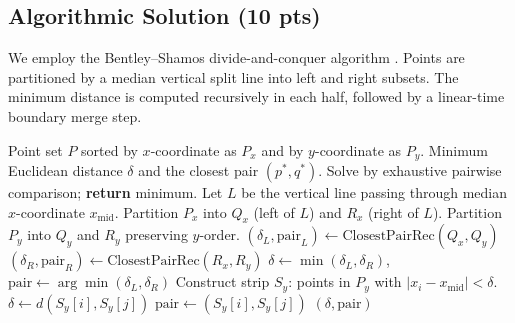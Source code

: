 \subsection{Algorithmic Solution (10 pts)}
We employ the Bentley--Shamos divide-and-conquer algorithm \cite{bentley1976divide}. Points are partitioned by a median vertical split line into left and right subsets. The minimum distance is computed recursively in each half, followed by a linear-time boundary merge step.

\begin{algorithm}[H]
\caption{2D Closest Pair (Divide-and-Conquer)}
\label{alg:closest_pair}
\begin{algorithmic}[1]
\REQUIRE Point set $P$ sorted by $x$-coordinate as $P_x$ and by $y$-coordinate as $P_y$.
\ENSURE Minimum Euclidean distance $\delta$ and the closest pair $(p^*, q^*)$.
    \STATE Solve by exhaustive pairwise comparison; \textbf{return} minimum.
\ENDIF
\STATE Let $L$ be the vertical line passing through median $x$-coordinate $x_{\text{mid}}$.
\STATE Partition $P_x$ into $Q_x$ (left of $L$) and $R_x$ (right of $L$).
\STATE Partition $P_y$ into $Q_y$ and $R_y$ preserving $y$-order.
\STATE $(\delta_L, \text{pair}_L) \leftarrow \text{ClosestPairRec}(Q_x, Q_y)$
\STATE $(\delta_R, \text{pair}_R) \leftarrow \text{ClosestPairRec}(R_x, R_y)$
\STATE $\delta \leftarrow \min(\delta_L, \delta_R)$, $\text{pair} \leftarrow \arg\min(\delta_L, \delta_R)$
\STATE Construct strip $S_y$: points in $P_y$ with $|x_i - x_{\text{mid}}| < \delta$.
            \STATE $\delta \leftarrow d(S_y[i], S_y[j])$
            \STATE $\text{pair} \leftarrow (S_y[i], S_y[j])$
        \ENDIF
    \ENDFOR
\ENDFOR
\RETURN $(\delta, \text{pair})$
\end{algorithmic}
\end{algorithm}

